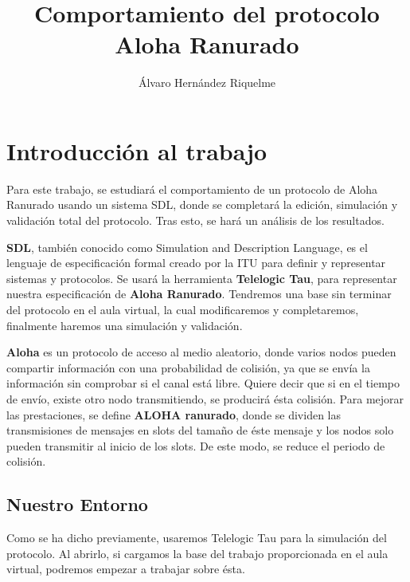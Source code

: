 \documentclass{article}
\title{Comportamiento del protocolo Aloha Ranurado}
\author{Álvaro Hernández Riquelme}
\begin{document}
\maketitle

\tableofcontents
\newpage



\section{Introducción al trabajo}

Para este trabajo, se estudiará el comportamiento de un protocolo de Aloha Ranurado usando un sistema SDL, donde se completará la edición, simulación y validación total del protocolo. Tras esto, se hará un análisis de los resultados.

\quad

\textbf{SDL}, también conocido como Simulation and Description Language, es el lenguaje de especificación formal creado por la ITU para definir y representar sistemas y protocolos. Se usará la herramienta \textbf{Telelogic Tau}, para representar nuestra especificación de \textbf{Aloha Ranurado}. Tendremos una base sin terminar del protocolo en el aula virtual, la cual modificaremos y completaremos, finalmente haremos una simulación y validación. 

\quad

\textbf{Aloha} es un protocolo de acceso al medio aleatorio, donde varios nodos pueden compartir información con una probabilidad de colisión, ya que se envía la información sin comprobar si el canal está libre. Quiere decir que si en el tiempo de envío, existe otro nodo transmitiendo, se producirá ésta colisión. Para mejorar las prestaciones, se define \textbf{ALOHA ranurado}, donde se dividen las transmisiones de mensajes en slots del tamaño de éste mensaje y los nodos solo pueden transmitir al inicio de los slots. De este modo, se reduce el periodo de colisión.

\subsection{Nuestro Entorno}

Como se ha dicho previamente, usaremos Telelogic Tau para la simulación del protocolo. Al abrirlo, si cargamos la base del trabajo proporcionada en el aula virtual, podremos empezar a trabajar sobre ésta.
\end{document}
